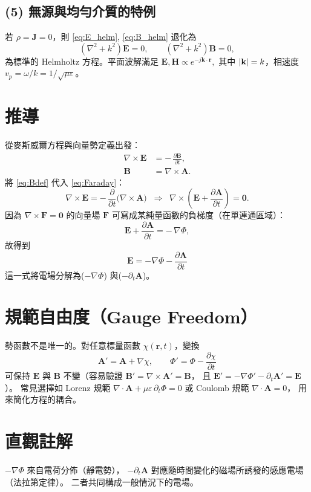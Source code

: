 \documentclass{article}
\begin{document}
\subsection*{(5) 無源與均勻介質的特例}
若 $\rho=\mathbf{J}=0$，則 \eqref{eq:E_helm}, \eqref{eq:B_helm} 退化為
\[
\left(\nabla^2 + k^2\right)\mathbf{E}=0,\qquad
\left(\nabla^2 + k^2\right)\mathbf{B}=0,
\]
為標準的 Helmholtz 方程。平面波解滿足
\(
\mathbf{E},\mathbf{H} \propto e^{-j\mathbf{k}\cdot\mathbf{r}},
\)
其中 $\abs{\mathbf{k}}=k$，相速度 $v_p=\omega/k=1/\sqrt{\mu\varepsilon}$。
\section*{推導}
從麥斯威爾方程與向量勢定義出發：
\begin{align}
\nabla\times\mathbf{E} &= -\,\frac{\partial \mathbf{B}}{\partial t}, \label{eq:Faraday}\\
\mathbf{B} &= \nabla\times\mathbf{A}. \label{eq:Bdef}
\end{align}
將 \eqref{eq:Bdef} 代入 \eqref{eq:Faraday}：
\[
\nabla\times\mathbf{E}
= -\,\frac{\partial}{\partial t}\bigl(\nabla\times\mathbf{A}\bigr)
\;\;\Longrightarrow\;\;
\nabla\times\!\left(\mathbf{E}+\frac{\partial \mathbf{A}}{\partial t}\right)=\mathbf{0}.
\]
因為 $\nabla\times\mathbf{F}=\mathbf{0}$ 的向量場 $\mathbf{F}$ 可寫成某純量函數的負梯度（在單連通區域）：
\[
\mathbf{E}+\frac{\partial \mathbf{A}}{\partial t}=-\,\nabla\Phi,
\]
故得到
\[
\boxed{\;\mathbf{E}=-\nabla\Phi-\frac{\partial \mathbf{A}}{\partial t}\;}
\]
這一式將電場分解為\;($-\nabla\Phi$) 與\;($-\partial_t\mathbf{A}$)。

\section*{規範自由度（Gauge Freedom）}
勢函數不是唯一的。對任意標量函數 $\chi(\mathbf{r},t)$，變換
\[
\mathbf{A}'=\mathbf{A}+\nabla\chi,
\qquad
\Phi'=\Phi-\frac{\partial\chi}{\partial t}
\]
可保持 $\mathbf{E}$ 與 $\mathbf{B}$ 不變（容易驗證 $\mathbf{B}'=\nabla\times\mathbf{A}'=\mathbf{B}$，
且 $\mathbf{E}'=-\nabla\Phi'-\partial_t\mathbf{A}'=\mathbf{E}$）。
常見選擇如 Lorenz 規範 $\nabla\cdot\mathbf{A}+\mu\varepsilon\,\partial_t\Phi=0$ 或 Coulomb 規範 $\nabla\cdot\mathbf{A}=0$，
用來簡化方程的耦合。

\section*{直觀註解}
\(-\nabla\Phi\) 來自電荷分佈（靜電勢），
\(-\partial_t\mathbf{A}\) 對應隨時間變化的磁場所誘發的感應電場（法拉第定律）。
二者共同構成一般情況下的電場。
\end{document}
